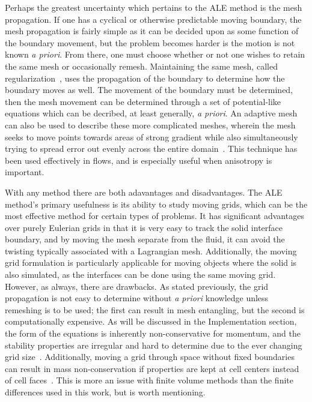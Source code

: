 \documentclass{article}
\begin{document}
Perhaps the greatest uncertainty which pertains to the ALE method is the mesh propagation.  If one has a cyclical or otherwise predictable moving boundary, the mesh propagation is fairly simple as it can be decided upon as some function of the boundary movement, but the problem becomes harder is the motion is not known \emph{a priori}.  From there, one must choose whether or not one wishes to retain the same mesh or occasionally remesh.  Maintaining the same mesh, called regularization~\cite{sarrate01}, uses the propagation of the boundary to determine how the boundary moves as well.  The movement of the boundary must be determined, then the mesh movement can be determined through a set of potential-like equations which can be decribed, at least generally, \emph{a priori}.  An adaptive mesh can also be used to describe these more complicated meshes, wherein the mesh seeks to move points towards areas of strong gradient while also simultaneously trying to spread error out evenly across the entire domain~\cite{sarrate01}.  This technique has been used effectively in flows, and is especially useful when anisotropy is important.

With any method there are both adavantages and disadvantages.  The ALE method's primary usefulness is its ability to study moving grids, which can be the most effective method for certain types of problems.  It has significant advantages over purely Eulerian grids in that it is very easy to track the solid interface boundary, and by moving the mesh separate from the fluid, it can avoid the twisting typically associated with a Lagrangian mesh.  Additionally, the moving grid formulation is particularly applicable for moving objects where the solid is also simulated, as the interfaces can be done using the same moving grid.  However, as always, there are drawbacks.  As stated previously, the grid propagation is not easy to determine without \emph{a priori} knowledge unless remeshing is to be used; the first can result in mesh entangling, but the second is computationally expensive.   As will be discussed in the Implementation section, the form of the equations is inherently non-conservative for momentum, and the stability properties are irregular and hard to determine due to the ever changing grid size~\cite{hirt74}.  Additionally, moving a grid through space without fixed boundaries can result in mass non-conservation if properties are kept at cell centers instead of cell faces~\cite{ferziger12}.  This is more an issue with finite volume methods than the finite differences used in this work, but is worth mentioning.
\end{document}
